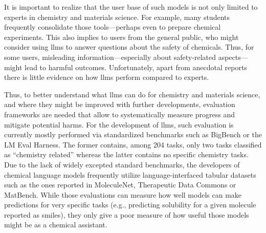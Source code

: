 \documentclass[11pt, oneside]{article}
\begin{document}
It is important to realize that the user base of such models is not only limited to experts in chemistry and materials science. 
For example, many students frequently consolidate those tools---perhaps even to prepare chemical experiments.\cite{Intelligent.com_2023}
This also implies to users from the general public, who might consider using \glspl{llm} to answer questions about the safety of chemicals.
Thus, for some users, misleading information---especially about safety-related aspects---might lead to harmful outcomes. 
Unfortunately, apart from anecdotal reports there is little evidence on how \glspl{llm} perform compared to experts.

Thus, to better understand what \glspl{llm} can do for chemistry and materials science, and where they might be improved with further developments, evaluation frameworks are needed that allow to systematically measure progress and mitigate potential harms.
For the development of \glspl{llm}, such evaluation is currently mostly performed via standardized benchmarks such as BigBench\cite{srivastava2022beyond} or the LM Eval Harness.\cite{eval-harness}
The former contains, among 204 tasks, only two tasks classified as \enquote{chemistry related} whereas the latter contains no specific chemistry tasks.
Due to the lack of widely excepted standard benchmarks, the developers of chemical language models\cite{jablonka2024leveraging, guo2023large, ahmad2022chemberta2, Cai_2024} frequently utilize language-interfaced\cite{dinh2022lift} tabular datasets such as the ones reported in MoleculeNet,\cite{wu2018moleculenet} Therapeutic Data Commons\cite{huang2021therapeutics} or MatBench.\cite{dunn2020benchmarking}
While those evaluations can measure how well models can make predictions for very specific tasks (e.g., predicting solubility for a given molecule reported as \gls{smiles}), they only give a poor measure of how useful those models might be as a chemical assistant.
\end{document}
